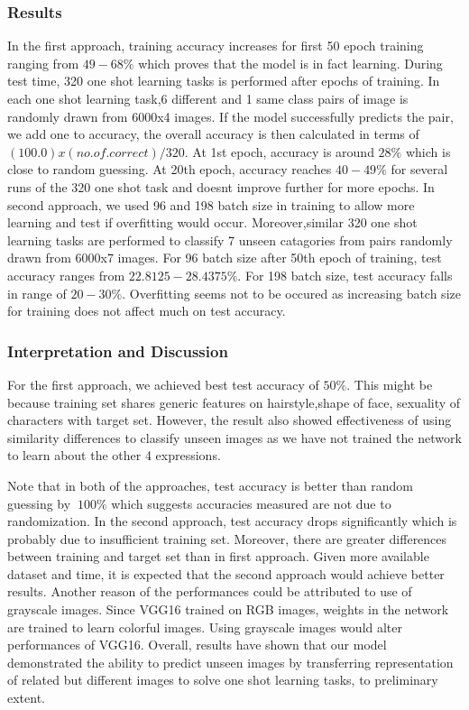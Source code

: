 \documentclass{article}
\begin{document}
\subsubsection{\textbf{Results}}

In the first approach, training accuracy increases for first 50 epoch training ranging from $49-68\%$ which proves that the model is in fact learning. During test time, 320 one shot learning tasks is performed after epochs of training. In each one shot learning task,6 different and 1 same class pairs of image is randomly drawn from 6000x4 images. If the model successfully predicts the pair, we add one to accuracy, the overall accuracy is then calculated in terms of $(100.0)x( no.of.correct )/ 320$. At 1st epoch, accuracy is around $28\%$ which is close to random guessing. At 20th epoch, accuracy reaches $40-49\%$ for several runs of the 320 one shot task and doesnt improve further for more epochs. In second approach, we used 96 and 198 batch size in training to allow more learning and test if overfitting would occur. Moreover,similar 320 one shot learning tasks are performed to classify 7 unseen catagories from pairs randomly drawn from 6000x7 images. For 96 batch size after 50th epoch of training, test accuracy ranges from $22.8125-28.4375\%$. For 198 batch size, test accuracy falls in range of $20-30\%$. Overfitting seems not to be occured as increasing batch size for training does not affect much on test accuracy.

\subsubsection{\textbf{Interpretation and Discussion}}

For the first approach, we achieved best test accuracy of $50\%$. This might be because training set shares generic features on hairstyle,shape of face, sexuality of characters with target set. However, the result also showed effectiveness of using similarity differences to classify unseen images as we have not trained the network to learn about the other 4 expressions.

Note that in both of the approaches, test accuracy is better than random guessing by $~100\%$ which suggests accuracies measured are not due to randomization. In the second approach, test accuracy drops significantly which is probably due to insufficient training set. Moreover, there are greater differences between training and target set than in first approach. Given more available dataset and time, it is expected that the second approach would achieve better results. Another reason of the performances could be attributed to use of grayscale images. Since VGG16 trained on RGB images, weights in the network are trained to learn colorful images. Using grayscale images would alter performances of VGG16. Overall, results have shown that our model demonstrated the ability to predict unseen images by transferring representation of related but different images to solve one shot learning tasks, to preliminary extent.
\end{document}
